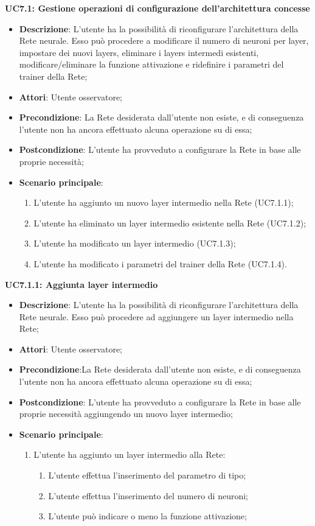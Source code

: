 \textbf{UC7.1: Gestione operazioni di configurazione dell'architettura concesse}
\label{UC7.1: Gestione operazioni di configurazione dell'architettura concesse}
\noindent
\begin{itemize}
\item \textbf{Descrizione}: L'utente ha la possibilit\`a di riconfigurare l'architettura della Rete neurale. Esso pu\`o procedere a modificare il numero di neuroni per layer, impostare dei nuovi layers, eliminare i layers intermedi esistenti, modificare/eliminare la funzione attivazione e ridefinire i parametri del trainer della Rete;
\item \textbf{Attori}: Utente osservatore;
\item \textbf{Precondizione}: La Rete desiderata dall'utente non esiste, e di conseguenza l'utente non ha ancora effettuato alcuna operazione su di essa;
\item \textbf{Postcondizione}: L'utente ha provveduto a configurare la Rete in base alle proprie necessit\`a;
\item \textbf{Scenario principale}:
\begin{enumerate}
\item L'utente ha aggiunto un nuovo layer intermedio nella Rete (UC7.1.1);
\item L'utente ha eliminato un layer intermedio esistente nella Rete (UC7.1.2);
\item L'utente ha modificato un layer intermedio (UC7.1.3);
\item L'utente ha modificato i parametri del trainer della Rete (UC7.1.4).
\end{enumerate}
\end{itemize}

\textbf{UC7.1.1: Aggiunta layer intermedio}
\label{UC7.1.1: Aggiunta layer intemrdio}
\noindent
\begin{itemize}
\item \textbf{Descrizione}: L'utente ha la possibilit\`a di riconfigurare l'architettura della Rete neurale. Esso pu\`o procedere ad aggiungere un layer intermedio nella Rete;
\item \textbf{Attori}: Utente osservatore;
\item \textbf{Precondizione}:La Rete desiderata dall'utente non esiste, e di conseguenza l'utente non ha ancora effettuato alcuna operazione su di essa;
\item \textbf{Postcondizione}: L'utente ha provveduto a configurare la Rete in base alle proprie necessit\`a aggiungendo un nuovo layer intermedio;
\item \textbf{Scenario principale}:
\begin{enumerate}
\item L'utente ha aggiunto un layer intermedio alla Rete:
\begin{enumerate}
\item L'utente effettua l'inserimento del parametro di tipo;
\item L'utente effettua l'inserimento del numero di neuroni;
\item L'utente pu\`o indicare o meno la funzione attivazione;
\end{enumerate}
\end{enumerate}
\end{itemize}

